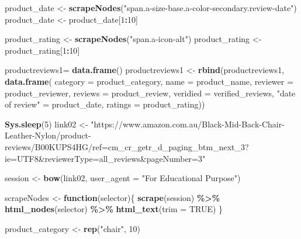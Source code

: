 \documentclass[
]{article}
\newenvironment{Shaded}{\begin{snugshade}}{\end{snugshade}}
\newcommand{\AttributeTok}[1]{\textcolor[rgb]{0.13,0.29,0.53}{#1}}
\newcommand{\ConstantTok}[1]{\textcolor[rgb]{0.56,0.35,0.01}{#1}}
\newcommand{\ControlFlowTok}[1]{\textcolor[rgb]{0.13,0.29,0.53}{\textbf{#1}}}
\newcommand{\DecValTok}[1]{\textcolor[rgb]{0.00,0.00,0.81}{#1}}
\newcommand{\FunctionTok}[1]{\textcolor[rgb]{0.13,0.29,0.53}{\textbf{#1}}}
\newcommand{\NormalTok}[1]{#1}
\newcommand{\OtherTok}[1]{\textcolor[rgb]{0.56,0.35,0.01}{#1}}
\newcommand{\SpecialCharTok}[1]{\textcolor[rgb]{0.81,0.36,0.00}{\textbf{#1}}}
\newcommand{\StringTok}[1]{\textcolor[rgb]{0.31,0.60,0.02}{#1}}
\begin{document}
\begin{Shaded}
\begin{Highlighting}[]
\NormalTok{  product\_date }\OtherTok{\textless{}{-}} \FunctionTok{scrapeNodes}\NormalTok{(}\StringTok{"span.a{-}size{-}base.a{-}color{-}secondary.review{-}date"}\NormalTok{)}
\NormalTok{  product\_date }\OtherTok{\textless{}{-}}\NormalTok{ product\_date[}\DecValTok{1}\SpecialCharTok{:}\DecValTok{10}\NormalTok{]}
  
\NormalTok{  product\_rating }\OtherTok{\textless{}{-}} \FunctionTok{scrapeNodes}\NormalTok{(}\StringTok{"span.a{-}icon{-}alt"}\NormalTok{)}
\NormalTok{  product\_rating }\OtherTok{\textless{}{-}}\NormalTok{ product\_rating[}\DecValTok{1}\SpecialCharTok{:}\DecValTok{10}\NormalTok{]}
  
\NormalTok{  productreviews1}\OtherTok{=} \FunctionTok{data.frame}\NormalTok{()}
\NormalTok{  productreviews1 }\OtherTok{\textless{}{-}} \FunctionTok{rbind}\NormalTok{(productreviews1, }\FunctionTok{data.frame}\NormalTok{(}
                      \AttributeTok{category =}\NormalTok{ product\_category,}
                      \AttributeTok{name =}\NormalTok{ product\_name,}
                      \AttributeTok{reviewer =}\NormalTok{ product\_reviewer,}
                      \AttributeTok{reviews =}\NormalTok{ product\_review,}
                      \AttributeTok{veridied =}\NormalTok{ verified\_reviews,}
                      \StringTok{"date of review"} \OtherTok{=}\NormalTok{ product\_date,}
                      \AttributeTok{ratings =}\NormalTok{ product\_rating))}

  
 \FunctionTok{Sys.sleep}\NormalTok{(}\DecValTok{5}\NormalTok{)}
\NormalTok{link02 }\OtherTok{\textless{}{-}} \StringTok{"https://www.amazon.com.au/Black{-}Mid{-}Back{-}Chair{-}Leather{-}Nylon/product{-}reviews/B00KUPS4HG/ref=cm\_cr\_getr\_d\_paging\_btm\_next\_3?ie=UTF8\&reviewerType=all\_reviews\&pageNumber=3"}


\NormalTok{  session }\OtherTok{\textless{}{-}} \FunctionTok{bow}\NormalTok{(link02,}
               \AttributeTok{user\_agent =} \StringTok{"For Educational Purpose"}\NormalTok{)}

\NormalTok{  scrapeNodes }\OtherTok{\textless{}{-}} \ControlFlowTok{function}\NormalTok{(selector)\{}
    \FunctionTok{scrape}\NormalTok{(session) }\SpecialCharTok{\%\textgreater{}\%}
      \FunctionTok{html\_nodes}\NormalTok{(selector) }\SpecialCharTok{\%\textgreater{}\%}
      \FunctionTok{html\_text}\NormalTok{(}\AttributeTok{trim =} \ConstantTok{TRUE}\NormalTok{)}
\NormalTok{  \}}

\NormalTok{  product\_category }\OtherTok{\textless{}{-}} \FunctionTok{rep}\NormalTok{(}\StringTok{"chair"}\NormalTok{, }\DecValTok{10}\NormalTok{)}


\end{Highlighting}
\end{Shaded}
\end{document}
